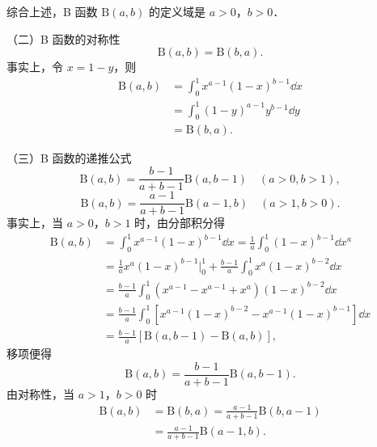 综合上述，B 函数 $\mathrm{B}(a,b)$ 的定义域是 $a>0$，$b>0$．

（二）B 函数的对称性
\[
\mathrm{B}(a,b)=\mathrm{B}(b,a).
\]
事实上，令 $x=1-y$，则
\[
\begin{aligned}
\mathrm{B}(a,b)&=\int_{0}^{1}x^{a-1}(1-x)^{b-1}\dd x\\
&=\int_{0}^{1}(1-y)^{a-1}y^{b-1}\dd y\\
&=\mathrm{B}(b,a).
\end{aligned}
\]

（三）B 函数的递推公式
\[
\mathrm{B}(a,b)=\frac{b-1}{a+b-1}\mathrm{B}(a,b-1)\quad(a>0,b>1),
\]
\[
\mathrm{B}(a,b)=\frac{a-1}{a+b-1}\mathrm{B}(a-1,b)\quad(a>1,b>0).
\]
事实上，当 $a>0$，$b>1$ 时，由分部积分得
\[
\begin{aligned}
\mathrm{B}(a,b)&=\int_{0}^{1}x^{a-1}(1-x)^{b-1}\dd x=\frac{1}{a}\int_{0}^{1}(1-x)^{b-1}\dd x^{a}\\
&=\frac{1}{a}x^{a}(1-x)^{b-1}\bigg|_{0}^{1}+\frac{b-1}{a}\int_{0}^{1}x^{a}(1-x)^{b-2}\dd x\\
&=\frac{b-1}{a}\int_{0}^{1}\left(x^{a-1}-x^{a-1}+x^{a}\right)(1-x)^{b-2}\dd x\\
&=\frac{b-1}{a}\int_{0}^{1}\left[x^{a-1}(1-x)^{b-2}-x^{a-1}(1-x)^{b-1}\right]\dd x\\
&=\frac{b-1}{a}\left[\mathrm{B}(a,b-1)-\mathrm{B}(a,b)\right],
\end{aligned}
\]
移项便得
\[
\mathrm{B}(a,b)=\frac{b-1}{a+b-1}\mathrm{B}(a,b-1).
\]
由对称性，当 $a>1$，$b>0$ 时
\[
\begin{aligned}
\mathrm{B}(a,b)&=\mathrm{B}(b,a)=\frac{a-1}{a+b-1}\mathrm{B}(b,a-1)\\
&=\frac{a-1}{a+b-1}\mathrm{B}(a-1,b).
\end{aligned}
\]

